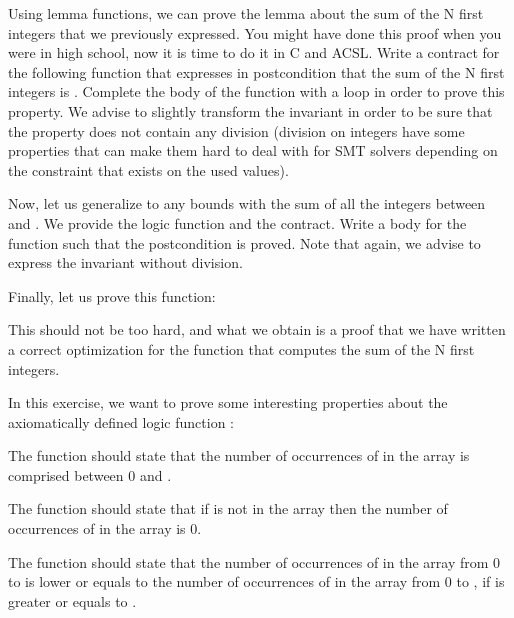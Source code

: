 Using lemma functions, we can prove the lemma about the sum of the N first
integers that we previously expressed. You might have done this proof when you
were in high school, now it is time to do it in C and ACSL. Write a contract for
the following function that expresses in postcondition that the sum of the N
first integers is . Complete the body of the function with
a loop in order to prove this property. We advise to slightly transform the
invariant in order to be sure that the property does not contain any division
(division on integers have some properties that can make them hard to deal with
for SMT solvers depending on the constraint that exists on the used values).




Now, let us generalize to any bounds with the sum of all the integers between
 and . We provide the logic function and the
contract. Write a body for the function such that the postcondition is proved.
Note that again, we advise to express the invariant without division.




Finally, let us prove this function:




This should not be too hard, and what we obtain is a proof that we have written
a correct optimization for the function that computes the sum of the N first
integers.






In this exercise, we want to prove some interesting properties about the
axiomatically defined logic function :




The function  should state that the number of
occurrences of  in the array is comprised between 0 and
.


The function  should state that if  is
not in the array then the number of occurrences of  in the array
is 0.


The function  should state that the number of
occurrences of  in the array from 0 to  is lower
or equals to the number of occurrences of  in the array from 0
to , if  is greater or equals to
.


